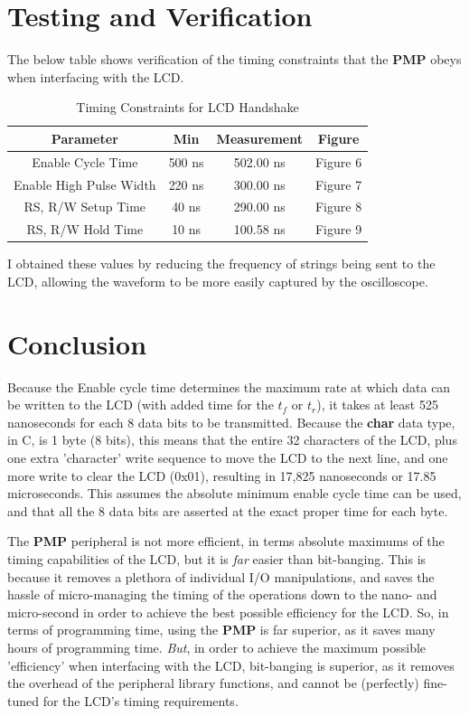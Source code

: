 \documentclass[a4paper, 12pt]{article}
\begin{document}
\newpage
\section{Testing and Verification}
The below table shows verification of the timing constraints that the \textbf{PMP} obeys when interfacing with the LCD.
\begin{table}[ht]
\centering
\begin{tabular}{c|c|c|c}
\textbf{Parameter} & \textbf{Min} & \textbf{Measurement} & \textbf{Figure} \\
\hline
Enable Cycle Time & 500 ns & 502.00 ns & Figure 6 \\
Enable High Pulse Width & 220 ns & 300.00 ns & Figure 7 \\ 
RS, R/W Setup Time & 40 ns & 290.00 ns & Figure 8 \\
RS, R/W Hold Time & 10 ns & 100.58 ns & Figure 9 \\
\end{tabular}
\caption{Timing Constraints for LCD Handshake}
\end{table}

I obtained these values by reducing the frequency of strings being sent to the LCD, allowing the waveform to be more easily captured by the oscilloscope. 

\section{Conclusion}
Because the Enable cycle time determines the maximum rate at which data can be written to the LCD (with added time for the $t_f$ or $t_r$), it takes at least 525 nanoseconds for each 8 data bits to be transmitted. Because the \textbf{char} data type, in C, is 1 byte (8 bits), this means that the entire 32 characters of the LCD, plus one extra 'character' write sequence to move the LCD to the next line, and one more write to clear the LCD (0x01), resulting in 17,825 nanoseconds or 17.85 microseconds. This assumes the absolute minimum enable cycle time can be used, and that all the 8 data bits are asserted at the exact proper time for each byte.

The \textbf{PMP} peripheral is not more efficient, in terms absolute maximums of the timing capabilities of the LCD, but it is \textit{far} easier than bit-banging. This is because it removes a plethora of individual I/O manipulations, and saves the hassle of micro-managing the timing of the operations down to the nano- and micro-second in order to achieve the best possible efficiency for the LCD. So, in terms of programming time, using the \textbf{PMP} is far superior, as it saves many hours of programming time. \textit{But}, in order to achieve the maximum possible 'efficiency' when interfacing with the LCD, bit-banging is superior, as it removes the overhead of the peripheral library functions, and cannot be (perfectly) fine-tuned for the LCD's timing requirements.
\end{document}
